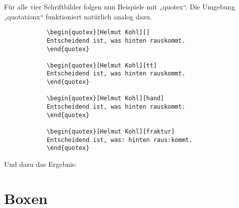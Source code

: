 			Für alle vier Schriftbilder folgen nun Beispiele mit „quotex“. Die Umgebung „quotationx“ funktioniert natürlich analog dazu.

			\begin{verbatim}
			\begin{quotex}[Helmut Kohl][]
			Entscheidend ist, was hinten rauskommt.
			\end{quotex}

			\begin{quotex}[Helmut Kohl][tt]
			Entscheidend ist, was hinten rauskommt.
			\end{quotex}

			\begin{quotex}[Helmut Kohl][hand]
			Entscheidend ist, was hinten rauskommt.
			\end{quotex}

			\begin{quotex}[Helmut Kohl][fraktur]
			Entscheidend ist, was: hinten raus:kommt.
			\end{quotex}
			\end{verbatim}\newline

			Und dazu das Ergebnis: \newline

			\newline

		\section{Boxen}

